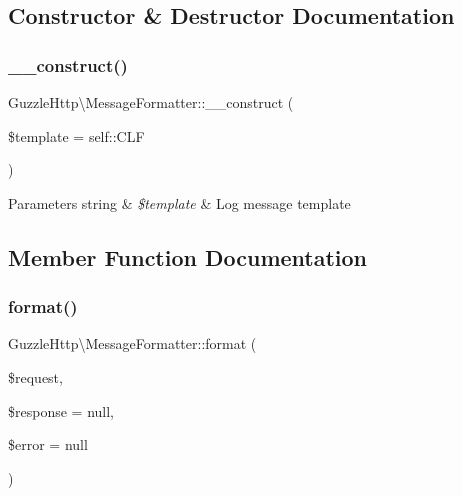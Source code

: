 \subsection{Constructor \& Destructor Documentation}
\mbox{\label{classGuzzleHttp_1_1MessageFormatter_a54d3d755b2aaaf0343bb2c9d8f0b71f0}} 
\subsubsection{\texorpdfstring{\+\_\+\+\_\+construct()}{\_\_construct()}}
{\footnotesize\ttfamily Guzzle\+Http\textbackslash{}\+Message\+Formatter\+::\+\_\+\+\_\+construct (\begin{DoxyParamCaption}\item[{}]{\$template = {\ttfamily self\+:\+:CLF} }\end{DoxyParamCaption})}


\begin{DoxyParams}[1]{Parameters}
string & {\em \$template} & Log message template \\
\hline
\end{DoxyParams}


\subsection{Member Function Documentation}
\mbox{\label{classGuzzleHttp_1_1MessageFormatter_a164dee7fed72177bca6288bac0d6736d}} 
\subsubsection{\texorpdfstring{format()}{format()}}
{\footnotesize\ttfamily Guzzle\+Http\textbackslash{}\+Message\+Formatter\+::format (\begin{DoxyParamCaption}\item[{\hyperlink{interfacePsr_1_1Http_1_1Message_1_1RequestInterface}{Request\+Interface}}]{\$request,  }\item[{\hyperlink{interfacePsr_1_1Http_1_1Message_1_1ResponseInterface}{Response\+Interface}}]{\$response = {\ttfamily null},  }\item[{\textbackslash{}Exception}]{\$error = {\ttfamily null} }\end{DoxyParamCaption})}

